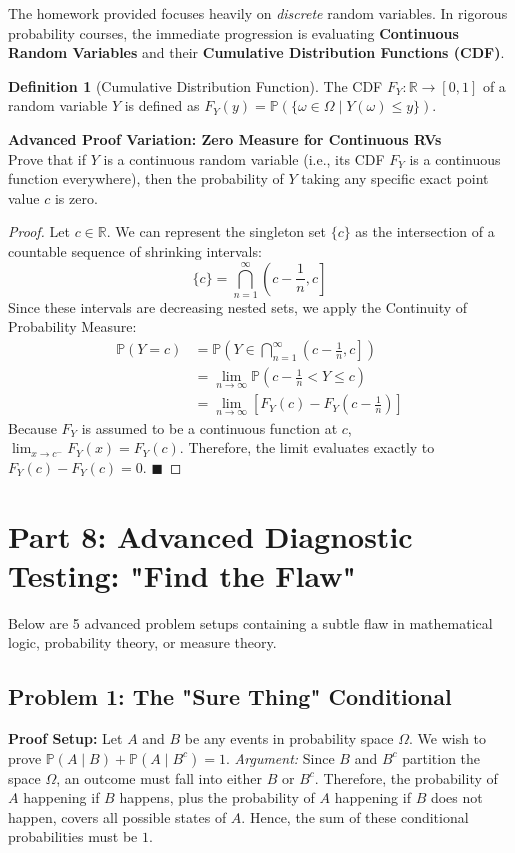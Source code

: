 \documentclass[11pt, letterpaper]{article}
\theoremstyle{definition}
\newtheorem{definition}[theorem]{Definition}
\newcommand{\R}{\mathbb{R}}
\renewcommand{\P}{\mathbb{P}}
\begin{document}
The homework provided focuses heavily on \textit{discrete} random variables. In rigorous probability courses, the immediate progression is evaluating \textbf{Continuous Random Variables} and their \textbf{Cumulative Distribution Functions (CDF)}.

\begin{definition}[Cumulative Distribution Function]
The CDF $F_Y: \R \to [0, 1]$ of a random variable $Y$ is defined as $F_Y(y) = \P(\{\omega \in \Omega \mid Y(\omega) \leq y\})$. 
\end{definition}

\textbf{Advanced Proof Variation: Zero Measure for Continuous RVs} \\
Prove that if $Y$ is a continuous random variable (i.e., its CDF $F_Y$ is a continuous function everywhere), then the probability of $Y$ taking any specific exact point value $c$ is zero.

\begin{proof}
Let $c \in \R$. We can represent the singleton set $\{c\}$ as the intersection of a countable sequence of shrinking intervals:
\[ \{c\} = \bigcap_{n=1}^{\infty} \left( c - \frac{1}{n}, c \right] \]
Since these intervals are decreasing nested sets, we apply the Continuity of Probability Measure:
\begin{align*}
    \P(Y = c) &= \P\left( Y \in \bigcap_{n=1}^{\infty} \left( c - \frac{1}{n}, c \right] \right) \\
    &= \lim_{n \to \infty} \P\left( c - \frac{1}{n} < Y \leq c \right) \\
    &= \lim_{n \to \infty} \left[ F_Y(c) - F_Y\left(c - \frac{1}{n}\right) \right]
\end{align*}
Because $F_Y$ is assumed to be a continuous function at $c$, $\lim_{x \to c^-} F_Y(x) = F_Y(c)$. Therefore, the limit evaluates exactly to $F_Y(c) - F_Y(c) = 0$. $\blacksquare$
\end{proof}

\section{Part 8: Advanced Diagnostic Testing: "Find the Flaw"}

Below are 5 advanced problem setups containing a subtle flaw in mathematical logic, probability theory, or measure theory. 

\subsection*{Problem 1: The "Sure Thing" Conditional}
\textbf{Proof Setup:} Let $A$ and $B$ be any events in probability space $\Omega$. We wish to prove $\P(A \mid B) + \P(A \mid B^c) = 1$.
\textit{Argument:} Since $B$ and $B^c$ partition the space $\Omega$, an outcome must fall into either $B$ or $B^c$. Therefore, the probability of $A$ happening if $B$ happens, plus the probability of $A$ happening if $B$ does not happen, covers all possible states of $A$. Hence, the sum of these conditional probabilities must be $1$.
\end{document}
